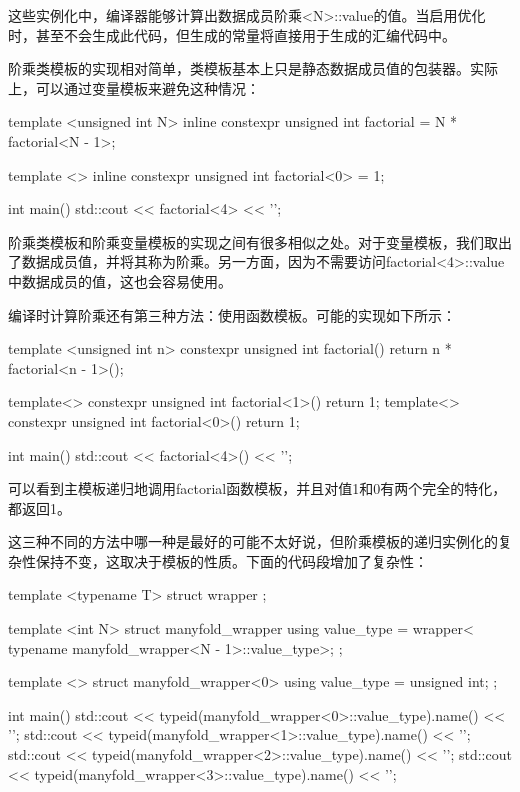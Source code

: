 这些实例化中，编译器能够计算出数据成员阶乘<N>::value的值。当启用优化时，甚至不会生成此代码，但生成的常量将直接用于生成的汇编代码中。

阶乘类模板的实现相对简单，类模板基本上只是静态数据成员值的包装器。实际上，可以通过变量模板来避免这种情况：

\begin{cppcode}
template <unsigned int N>
inline constexpr unsigned int factorial = N * factorial<N - 1>;

template <>
inline constexpr unsigned int factorial<0> = 1;

int main()
{
	std::cout << factorial<4> << '\n';
}
\end{cppcode}

阶乘类模板和阶乘变量模板的实现之间有很多相似之处。对于变量模板，我们取出了数据成员值，并将其称为阶乘。另一方面，因为不需要访问factorial<4>::value中数据成员的值，这也会容易使用。

编译时计算阶乘还有第三种方法：使用函数模板。可能的实现如下所示：

\begin{cppcode}
template <unsigned int n>
constexpr unsigned int factorial()
{
	return n * factorial<n - 1>();
}

template<> constexpr unsigned int factorial<1>() {
												return 1; }
template<> constexpr unsigned int factorial<0>() {
												return 1; }

int main()
{
	std::cout << factorial<4>() << '\n';
}
\end{cppcode}

可以看到主模板递归地调用factorial函数模板，并且对值1和0有两个完全的特化，都返回1。

这三种不同的方法中哪一种是最好的可能不太好说，但阶乘模板的递归实例化的复杂性保持不变，这取决于模板的性质。下面的代码段增加了复杂性：

\begin{cppcode}
template <typename T>
struct wrapper {};

template <int N>
struct manyfold_wrapper
{
	using value_type =
		wrapper<
			typename manyfold_wrapper<N - 1>::value_type>;
};

template <>
struct manyfold_wrapper<0>
{
	using value_type = unsigned int;
};

int main()
{
	std::cout <<
		typeid(manyfold_wrapper<0>::value_type).name() << '\n';
	std::cout <<
		typeid(manyfold_wrapper<1>::value_type).name() << '\n';
	std::cout <<
		typeid(manyfold_wrapper<2>::value_type).name() << '\n';
	std::cout <<
		typeid(manyfold_wrapper<3>::value_type).name() << '\n';
}
\end{cppcode}

